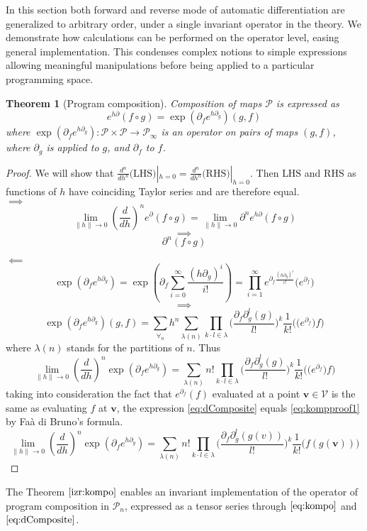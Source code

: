 \documentclass[smallcondensed]{svjour3}
\newcommand{\VV}{\mathcal{V}}
\newcommand{\vv}{\mathbf{v}}
\newcommand{\dP}{\mathcal{P}}
\newcommand{\D}{\partial}
\newtheorem{izrek}{Theorem}[section]
\begin{document}
 In this section both forward \cite{PcAD} and reverse \cite{ReverseAD} mode of automatic differentiation are generalized to arbitrary order, under a single invariant operator in the theory. We demonstrate how calculations can be performed on the operator level, easing general implementation. This condenses complex notions to simple expressions allowing meaningful manipulations before being applied to a particular programming space.
 
 \begin{izrek}[Program composition]\label{izr:kompo}
 Composition of maps $\dP$ is expressed as
 \begin{equation}\label{eq:kompo}
 e^{h\D}(f\circ g)=\exp(\D_fe^{h\D_g})(g,f)
 \end{equation}
 where $\exp(\D_fe^{h\D_g}):\dP\times\dP\to\dP_\infty$ is an operator on pairs of maps $(g,f)$, where $\D_g$ is applied to $g$, and $\D_f$ to $f$. 
 \end{izrek}
 
\begin{proof}
  We will show that $\frac{d^n}{dh^n}\text{(LHS)}|_{h=0}=\frac{d^n}{dh^n}\text{(RHS)}|_{h=0}$. Then $\text{LHS}$ and $\text{RHS}$ as functions
  of $h$ have coinciding Taylor series and are therefore equal.\\
 $\implies$
 $$\lim\limits_{\lVert h\rVert\to 0}(\frac{d}{dh})^ne^\D(f\circ g)=\lim\limits_{\lVert h\rVert\to 0}\D^ne^{h\D}(f\circ g)$$
 $$\implies$$
 \begin{equation}\label{eq:kompproof1}
 \D^n(f\circ g)
 \end{equation}
 
 $\impliedby$
 $$\exp(\D_fe^{h\D_g})=\exp\left(\D_f\sum\limits_{i=0}^{\infty}\frac{(h\D_g)^i}{i!}\right)=\prod_{i=1}^{\infty}e^{\D_f\frac{(h\D_g)^i}{i!}}\Big(e^{\D_f}\Big)$$
 $$\implies$$
 $$\exp(\D_fe^{h\D_g})(g,f)=\sum\limits_{\forall_n}h^n\sum\limits_{\lambda(n)}\prod\limits_{k\cdot l\in\lambda}\Big(\frac{\D_f\D_g^l(g)}{l!}\Big)^k\frac{1}{k!}\Big(\Big(e^{\D_f}\Big)f\Big)$$
 where $\lambda(n)$ stands for the partitions of $n$. Thus
 \begin{equation}\label{eq:dComposite}
 \lim\limits_{\lVert h\rVert\to 0}(\frac{d}{dh})^n\exp(\D_fe^{h\D_g})=\sum\limits_{\lambda(n)}n!\prod\limits_{k\cdot l\in\lambda}\Big(\frac{\D_f\D_g^l(g)}{l!}\Big)^k\frac{1}{k!}\Big(\Big(e^{\D_f}\Big)f\Big)
 \end{equation}
 taking into consideration the fact that $e^{\D_f}(f)$ evaluated at a point $\vv\in \VV$ is the same as evaluating $f$ at $\vv$, the expression \eqref{eq:dComposite} equals \eqref{eq:kompproof1} by Faà di Bruno's formula.
   \begin{equation}\label{eq:dCompositePoint}
   \lim\limits_{\lVert h\rVert\to 0}(\frac{d}{dh})^n\exp(\D_fe^{h\D_g})=\sum\limits_{\lambda(n)}n!\prod\limits_{k\cdot l\in\lambda}\Big(\frac{\D_f\D_g^l(g(v))}{l!}\Big)^k\frac{1}{k!}\Big(f(g(\vv))\Big)
   \end{equation}
 \end{proof}       
 The Theorem $\ref{izr:kompo}$ enables an invariant implementation of the operator of program composition in $\dP_n$, expressed as a tensor series through $\eqref{eq:kompo}$ and $\eqref{eq:dComposite}$. 
 
\end{document}
